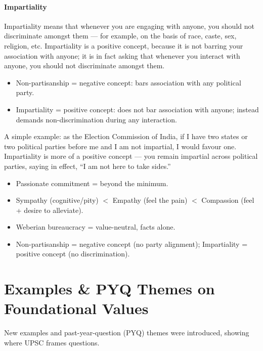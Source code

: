 \paragraph{Impartiality} Impartiality means that whenever you are engaging with anyone, you should not discriminate amongst them --- for example, on the basis of race, caste, sex, religion, etc. Impartiality is a positive concept, because it is not barring your association with anyone; it is in fact asking that whenever you interact with anyone, you should not discriminate amongst them.

\begin{ComparisonBox}
\begin{itemize}
\item Non-partisanship = negative concept: bars association with any political party.
\item Impartiality = positive concept: does not bar association with anyone; instead demands non-discrimination during any interaction.
\end{itemize}
\end{ComparisonBox}

A simple example: as the Election Commission of India, if I have two states or two political parties before me and I am not impartial, I would favour one. Impartiality is more of a positive concept --- you remain impartial across political parties, saying in effect, ``I am not here to take sides.''

\begin{QuickRevision}
\begin{itemize}
\item Passionate commitment = beyond the minimum.
\item Sympathy (cognitive/pity) $<$ Empathy (feel the pain) $<$ Compassion (feel + desire to alleviate).
\item Weberian bureaucracy = value-neutral, facts alone.
\item Non-partisanship = negative concept (no party alignment); Impartiality = positive concept (no discrimination).
\end{itemize}
\end{QuickRevision}

\section{Examples \& PYQ Themes on Foundational Values}

New examples and past-year-question (PYQ) themes were introduced, showing where UPSC frames questions.

